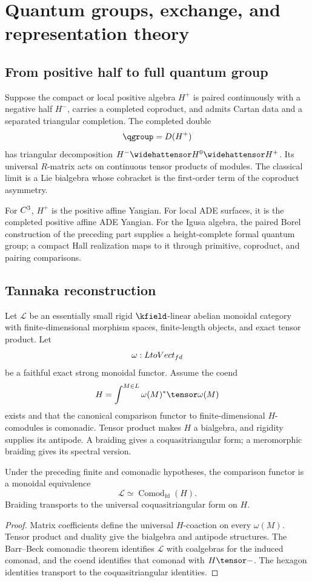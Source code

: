 \part{Quantum groups, exchange, and representation theory}

\chapter{From positive half to full quantum group}
Suppose the compact or local positive algebra $H^+$ is paired continuously with a negative half $H^-$, carries a completed coproduct, and admits Cartan data and a separated triangular completion. The completed double
\[
 \qgroup=\widehat D(H^+)
\]
has triangular decomposition $H^-\widehattensor H^0\widehattensor H^+$. Its universal $R$-matrix acts on continuous tensor products of modules. The classical limit is a Lie bialgebra whose cobracket is the first-order term of the coproduct asymmetry.

For $C^3$, $H^+$ is the positive affine Yangian. For local ADE surfaces, it is the completed positive affine ADE Yangian. For the Igusa algebra, the paired Borel construction of the preceding part supplies a height-complete formal quantum group; a compact Hall realization maps to it through primitive, coproduct, and pairing comparisons.

\chapter{Tannaka reconstruction}
Let $\mathcal L$ be an essentially small rigid $\kfield$-linear abelian monoidal category with finite-dimensional morphism spaces, finite-length objects, and exact tensor product. Let
\[
 \omega:LtoVect_{fd}
\]
be a faithful exact strong monoidal functor. Assume the coend
\[
 H=\int^{M\in\mathcal L}\omega(M)^*\tensor\omega(M)
\]
exists and that the canonical comparison functor to finite-dimensional $H$-comodules is comonadic. Tensor product makes $H$ a bialgebra, and rigidity supplies its antipode. A braiding gives a coquasitriangular form; a meromorphic braiding gives its spectral version.

\begin{theorem}
Under the preceding finite and comonadic hypotheses, the comparison functor is a monoidal equivalence
\[
 \mathcal L\simeq\operatorname{Comod}_{\mathrm{fd}}(H).
\]
Braiding transports to the universal coquasitriangular form on $H$.
\end{theorem}
\begin{proof}
Matrix coefficients define the universal $H$-coaction on every $\omega(M)$. Tensor product and duality give the bialgebra and antipode structures. The Barr--Beck comonadic theorem identifies $\mathcal L$ with coalgebras for the induced comonad, and the coend identifies that comonad with $H\tensor-$. The hexagon identities transport to the coquasitriangular identities.
\end{proof}

